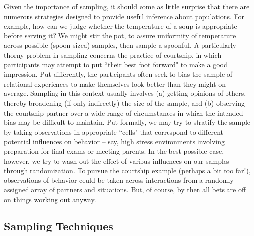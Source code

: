 \documentclass[11pt,openany]{book}\usepackage[]{graphicx}\usepackage[]{color}
\begin{document}
{Given the importance of sampling, it should come as little surprise that there are numerous strategies designed to provide useful inference about populations. For example, how can we judge whether the temperature of a soup is appropriate before serving it? We might stir the pot, to assure uniformity of temperature across possible (spoon-sized) samples, then sample a spoonful. A particularly thorny problem in sampling concerns the practice of courtship, in which participants may attempt to put ``their best foot forward" to make a good impression. Put differently, the participants often seek to bias the sample of relational experiences to make themselves look better than they might on average. Sampling in this context usually involves (a) getting opinions of others, thereby broadening (if only indirectly) the size of the sample, and (b) observing the courtship partner over a wide range of circumstances in which the intended bias may be difficult to maintain. Put formally, we may try to stratify the sample by taking observations in appropriate ``cells" that correspond to different potential influences on behavior -- say, high stress environments involving preparation for final exams or meeting parents. In the best possible case, however, we try to wash out the effect of various influences on our samples through randomization. To pursue the courtship example (perhaps a bit too far!), observations of behavior could be taken across interactions from a randomly assigned array of partners and situations. But, of course, by then all bets are off on things working out anyway.

\subsection{Sampling Techniques}

}
\end{document}
